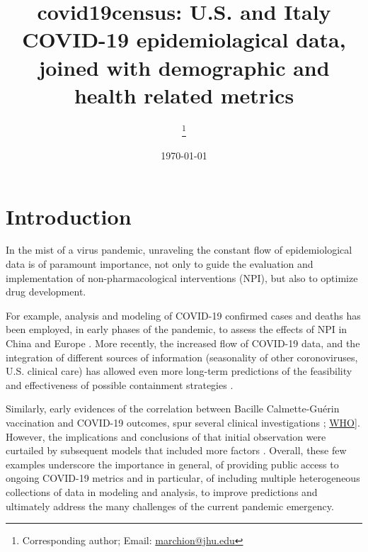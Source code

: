 \documentclass[12pt,halfline,a4paper,]{ouparticle}
\begin{document}
\title{covid19census: U.S. and Italy COVID-19 epidemiolagical data, joined with
demographic and health related metrics}

\author{%
\address{Department of Oncology, Johns Hopkins University School of Medicine,
Baltimore, MD, USA}
\and
{}\address{Department of Oncology, Johns Hopkins University School of Medicine,
Baltimore, MD, USA}\thanks{Corresponding author; Email: \href{mailto:marchion@jhu.edu}{marchion@jhu.edu}}
\and
{}\address{Another University}
}


\date{\today}


\maketitle



\hypertarget{introduction}{%
\section{Introduction}\label{introduction}}

In the mist of a virus pandemic, unraveling the constant flow of
epidemiological data is of paramount importance, not only to guide the
evaluation and implementation of non-pharmacological interventions
(NPI), but also to optimize drug development.

For example, analysis and modeling of COVID-19 confirmed cases and
deaths has been employed, in early phases of the pandemic, to assess the
effects of NPI in China and Europe \citep{flaxman2020, prem2020tlph}.
More recently, the increased flow of COVID-19 data, and the integration
of different sources of information (seasonality of other coronoviruses,
U.S. clinical care) has allowed even more long-term predictions of the
feasibility and effectiveness of possible containment strategies
\citep{kissler2020s}.

Similarly, early evidences of the correlation between Bacille
Calmette-Guérin vaccination and COVID-19 outcomes, spur several clinical
investigations \citep{miller2020m, shet2020m};
\href{https://www.who.int/news-room/commentaries/detail/bacille-calmette-gu\%C3\%A9rin-(bcg)-vaccination-and-covid-19}{WHO}{]}.
However, the implications and conclusions of that initial observation
were curtailed by subsequent models that included more factors
\citep[e.s. age;][]{fukui2020m}. Overall, these few examples underscore
the importance in general, of providing public access to ongoing
COVID-19 metrics and in particular, of including multiple heterogeneous
collections of data in modeling and analysis, to improve predictions and
ultimately address the many challenges of the current pandemic
emergency.
\end{document}
